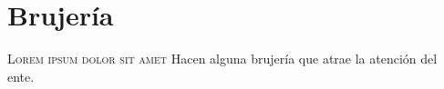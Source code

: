 

\chapter{Brujería}
\lettrine{L}{orem ipsum dolor sit amet} Hacen alguna brujería que atrae la atención del ente.